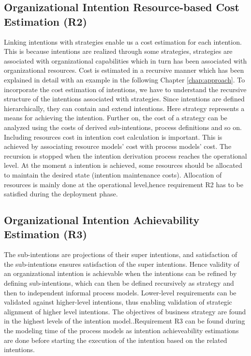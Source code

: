 \subsection{Organizational Intention Resource-based Cost Estimation (R2)}
Linking intentions with strategies enable us a cost estimation for each intention. This is because intentions are realized through some strategies, strategies are associated with organizational capabilities which in turn has been associated with organizational resources. Cost is estimated in a recursive manner which has been explained in detail with an example in the following Chapter \ref{chap:approach}. To incorporate the cost estimation of intentions, we have to understand the recursive structure of the intentions associated with strategies. Since intentions are defined hierarchically, they can contain and extend intentions. Here strategy represents a means for achieving the intention. Further on, the cost of a strategy can be analyzed using the costs of derived sub-intentions, process definitions and so on. Including resources cost in intention cost calculation is important. This is achieved by associating resource models' cost with process models' cost. The recursion is stopped when the intention derivation process reaches the operational level. At the moment a  intention is achieved, some resources should be allocated to maintain the desired state (intention maintenance costs)\cite{Mandic2010}. Allocation of resources is mainly done at the operational level,hence requirement R2 has to be satisfied during the deployment phase.

\subsection{Organizational Intention Achievability Estimation (R3)}
The sub-intentions are projections of their super intentions, and satisfaction of the sub-intentions ensures satisfaction of the super intentions. Hence validity of an organizational intention is achievable when the intentions can be refined by defining sub-intentions, which can then be defined recursively as strategy and then to independent informal process models. Lower-level requirements can be validated against higher-level intentions, thus enabling validation of strategic alignment of  higher level intentions. The objectives of business strategy are found in the highest levels of the intention model.\cite{Bleistein2006}.Requirement R3  can be found during the modeling time of the process models as intention achieveability estimations are done before starting the execution of the intention based on the related intentions.

